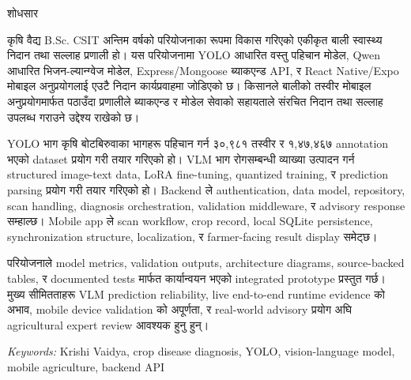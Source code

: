 \clearpage
{}
{}
{\nepalifont
\begin{center}
{\fontsize{18}{22}\selectfont शोधसार}
\end{center}

\vspace{1.5\baselineskip}
\fontsize{14}{20}\selectfont

कृषि वैद्य {\normalfont B.Sc. CSIT} अन्तिम वर्षको परियोजनाका रूपमा विकास गरिएको
एकीकृत बाली स्वास्थ्य निदान तथा सल्लाह प्रणाली हो। यस परियोजनामा
{\normalfont YOLO} आधारित वस्तु पहिचान मोडेल, {\normalfont Qwen} आधारित
भिजन-ल्यान्ग्वेज मोडेल, {\normalfont Express/Mongoose} ब्याकएन्ड
{\normalfont API}, र {\normalfont React Native/Expo} मोबाइल अनुप्रयोगलाई एउटै
निदान कार्यप्रवाहमा जोडिएको छ। किसानले बालीको तस्वीर मोबाइल अनुप्रयोगमार्फत
पठाउँदा प्रणालीले ब्याकएन्ड र मोडेल सेवाको सहायताले संरचित निदान तथा सल्लाह
उपलब्ध गराउने उद्देश्य राखेको छ।

{\normalfont YOLO} भाग कृषि बोटबिरुवाका भागहरू पहिचान गर्न ३०,९८१ तस्वीर र
१,४७,४६७ {\normalfont annotation} भएको {\normalfont dataset} प्रयोग गरी तयार
गरिएको हो। {\normalfont VLM} भाग रोगसम्बन्धी व्याख्या उत्पादन गर्न
{\normalfont structured image-text data}, {\normalfont LoRA fine-tuning},
{\normalfont quantized training}, र {\normalfont prediction parsing} प्रयोग गरी
तयार गरिएको हो। {\normalfont Backend} ले {\normalfont authentication},
{\normalfont data model}, {\normalfont repository}, {\normalfont scan handling},
{\normalfont diagnosis orchestration}, {\normalfont validation middleware}, र
{\normalfont advisory response} सम्हाल्छ। {\normalfont Mobile app} ले
{\normalfont scan workflow}, {\normalfont crop record},
{\normalfont local SQLite persistence}, {\normalfont synchronization structure},
{\normalfont localization}, र {\normalfont farmer-facing result display} समेट्छ।

परियोजनाले {\normalfont model metrics}, {\normalfont validation outputs},
{\normalfont architecture diagrams}, {\normalfont source-backed tables}, र
{\normalfont documented tests} मार्फत कार्यान्वयन भएको
{\normalfont integrated prototype} प्रस्तुत गर्छ। मुख्य सीमितताहरू
{\normalfont VLM prediction reliability}, {\normalfont live end-to-end runtime evidence}
को अभाव, {\normalfont mobile device validation} को अपूर्णता, र
{\normalfont real-world advisory} प्रयोग अघि {\normalfont agricultural expert review}
आवश्यक हुनु हुन्।
}

\vspace{2\baselineskip}
\noindent\textit{\fontsize{10}{12}\selectfont Keywords:} {\fontsize{10}{12}\selectfont Krishi Vaidya, crop disease diagnosis, YOLO, vision-language model, mobile agriculture, backend API}
